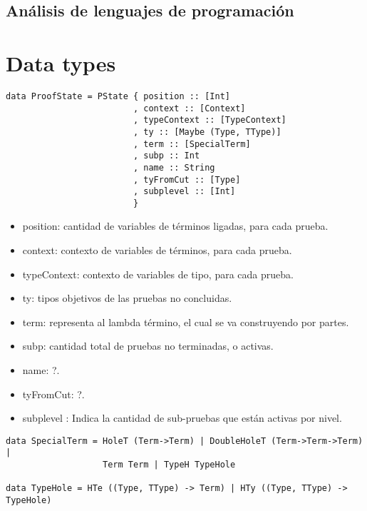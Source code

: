\documentclass[a4paper,11pt]{article}
\title{}
\author{}
\begin{document}
\maketitle

\begin{center}
\section*{Análisis de lenguajes de programación} 
\end{center}

\newpage{\pagestyle{empty}\cleardoublepage}

\section{Data types}

\begin{verbatim}
data ProofState = PState { position :: [Int]
                         , context :: [Context]
                         , typeContext :: [TypeContext]
                         , ty :: [Maybe (Type, TType)]
                         , term :: [SpecialTerm]
                         , subp :: Int
                         , name :: String
                         , tyFromCut :: [Type]
                         , subplevel :: [Int]
                         }
\end{verbatim}

\begin{itemize}
  \item position: cantidad de variables de términos ligadas, para cada prueba.
  \item context: contexto de variables de términos, para cada prueba.
  \item typeContext: contexto de variables de tipo, para cada prueba.
  \item ty: tipos objetivos de las pruebas no concluidas.
  \item term: representa al lambda término, el cual se va construyendo por partes.
  \item subp: cantidad total de pruebas no terminadas, o activas.
  \item name: ?.
  \item tyFromCut: ?.
  \item subplevel : Indica la cantidad de sub-pruebas que están activas por nivel.
\end{itemize}


\begin{verbatim}
data SpecialTerm = HoleT (Term->Term) | DoubleHoleT (Term->Term->Term) |
                   Term Term | TypeH TypeHole

data TypeHole = HTe ((Type, TType) -> Term) | HTy ((Type, TType) -> TypeHole)
\end{verbatim}
\end{document}
